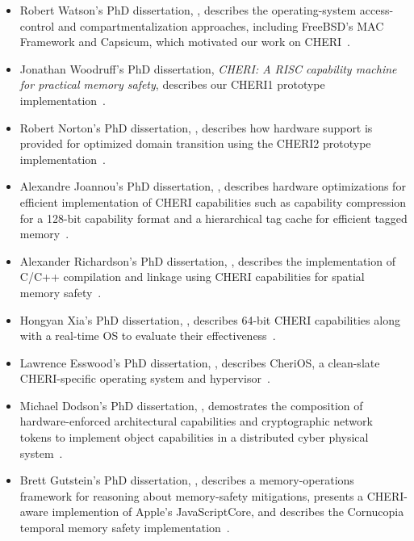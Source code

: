 \begin{itemize}
\item Robert Watson's PhD dissertation, ,
  describes the operating-system
  access-control and compartmentalization approaches, including FreeBSD's
  MAC Framework and Capsicum,
  which motivated our work on CHERI~\cite{Watson10a,UCAM-CL-TR-818}.

\item Jonathan Woodruff's PhD dissertation, \textit{CHERI: A RISC capability
  machine for practical memory safety}, describes our CHERI1 prototype
  implementation~\cite{UCAM-CL-TR-858}.

\item Robert Norton's PhD dissertation, ,
  describes how hardware support is provided for
  optimized domain transition using the CHERI2 prototype
  implementation~\cite{UCAM-CL-TR-887}.

\item Alexandre Joannou's PhD dissertation, ,
  describes hardware
  optimizations for efficient implementation of CHERI capabilities such as
  capability compression for a 128-bit capability format and a hierarchical tag
  cache for efficient tagged memory~\cite{UCAM-CL-TR-936}.

\item Alexander Richardson's PhD dissertation, ,
  describes the implementation
  of C/C++ compilation and linkage using CHERI capabilities for spatial memory
  safety~\cite{UCAM-CL-TR-949}.

\item Hongyan Xia's PhD dissertation, ,
  describes 64-bit CHERI capabilities along with a real-time OS to evaluate
  their effectiveness~\cite{UCAM-CL-TR-955}.

\item Lawrence Esswood's PhD dissertation, ,
  describes CheriOS, a clean-slate CHERI-specific
  operating system and hypervisor~\cite{UCAM-CL-TR-961}.

\item Michael Dodson's PhD dissertation, ,
  demostrates the composition of hardware-enforced architectural capabilities
  and cryptographic network tokens to implement object capabilities in a
  distributed cyber physical system~\cite{UCAM-CL-TR-963}.

\item Brett Gutstein's PhD dissertation, ,
  describes a memory-operations framework for reasoning about memory-safety
  mitigations, presents a CHERI-aware implemention of Apple’s JavaScriptCore,
  and describes the Cornucopia temporal memory safety implementation~\cite{UCAM-CL-TR-975}.


\end{itemize}
